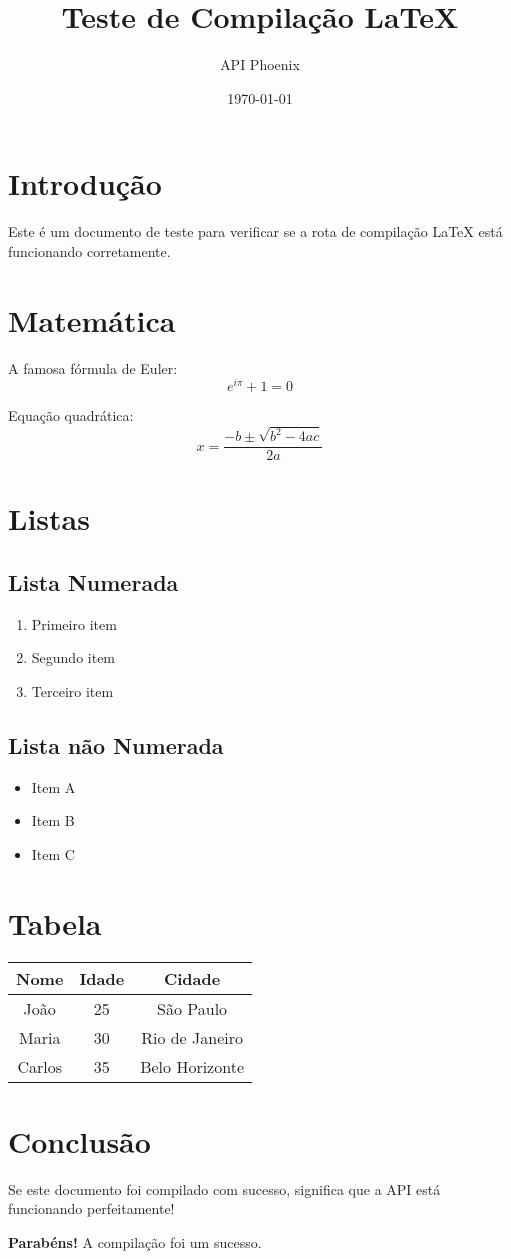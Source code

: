 \documentclass{article}
\title{Teste de Compilação LaTeX}
\author{API Phoenix}
\date{\today}
\begin{document}
\maketitle

\section{Introdução}
Este é um documento de teste para verificar se a rota de compilação LaTeX está funcionando corretamente.

\section{Matemática}
A famosa fórmula de Euler:
\[
e^{i\pi} + 1 = 0
\]

Equação quadrática:
\[
x = \frac{-b \pm \sqrt{b^2 - 4ac}}{2a}
\]

\section{Listas}
\subsection{Lista Numerada}
\begin{enumerate}
    \item Primeiro item
    \item Segundo item
    \item Terceiro item
\end{enumerate}

\subsection{Lista não Numerada}
\begin{itemize}
    \item Item A
    \item Item B
    \item Item C
\end{itemize}

\section{Tabela}
\begin{tabular}{|c|c|c|}
\hline
\textbf{Nome} & \textbf{Idade} & \textbf{Cidade} \\
\hline
João & 25 & São Paulo \\
Maria & 30 & Rio de Janeiro \\
Carlos & 35 & Belo Horizonte \\
\hline
\end{tabular}

\section{Conclusão}
Se este documento foi compilado com sucesso, significa que a API está funcionando perfeitamente!

\textbf{Parabéns!} A compilação foi um sucesso.
\end{document}
